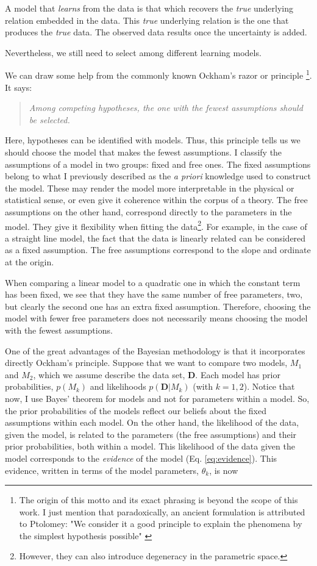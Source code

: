 A model that \emph{learns} from the data is that which recovers the \emph{true} underlying relation embedded in the data. This \emph{true} underlying relation is the one that produces the \emph{true} data. The observed data results once the uncertainty is added. 

Nevertheless, we still need to select among different learning models.  

We can draw some help from the commonly known Ockham's razor or principle \footnote{The origin of this motto and its exact phrasing is beyond the scope of this work. I just mention that paradoxically, an ancient formulation is attributed to Ptolomey: "We consider it a good principle to explain the phenomena by the simplest hypothesis possible" \citep{Franklin2002}}. It says:
\begin{quotation}
\textit{Among competing hypotheses, the one with the fewest assumptions should be selected.}
\end{quotation}

Here, hypotheses can be identified with models. Thus, this principle tells us we should choose the model that makes the fewest assumptions. I classify the assumptions of a model in two groups: fixed and free ones. The fixed assumptions belong to what I previously described as the \emph{a priori} knowledge used to construct the model. These may render the model more interpretable in the physical or statistical sense, or even give it coherence within the corpus of a theory. The free assumptions on the other hand, correspond directly to the parameters in the model. They give it flexibility when fitting the data\footnote{However, they can also introduce degeneracy in the parametric space.}. For example, in the case of a straight line model, the fact that the data is linearly related can be considered as a fixed assumption. The free assumptions correspond to the slope and ordinate at the origin. 

When comparing a linear model to a quadratic one in which the constant term has been fixed, we see that they have the same number of free parameters, two, but clearly the second one has an extra fixed assumption. Therefore, choosing the model with fewer free parameters does not necessarily means choosing the model with the fewest assumptions.

One of the great advantages of the Bayesian methodology is that it incorporates directly Ockham's principle. Suppose that we want to compare two models, $M_1$ and $M_2$, which we assume describe the data set, $\mathbf{D}$. Each model has prior probabilities, $p(M_k)$ and likelihoods $p(\mathbf{D}|M_k)$ (with $k=1,2$). Notice that now, I use Bayes' theorem for models and not for parameters within a model. So, the prior probabilities of the models reflect our beliefs about the fixed assumptions within each model. On the other hand, the likelihood of the data, given the model, is related to the parameters (the free assumptions) and their prior probabilities, both within a model. This likelihood of the data given the model corresponds to the \emph{evidence} of the model (Eq. \ref{eq:evidence}). This evidence, written in terms of the model parameters, $\theta_k$, is now

